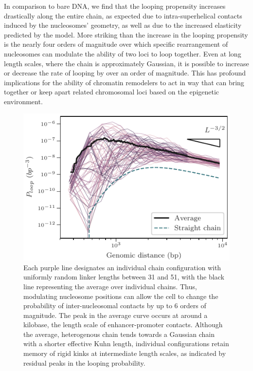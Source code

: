 \documentclass[%
 reprint,
superscriptaddress,
showpacs,preprintnumbers,
 amsmath,amssymb,
 aps,
 prl,
]{revtex4-1}
\begin{document}
In comparison to bare DNA, we find that the looping propensity increases
    drastically along the entire chain, as expected due to intra-superhelical
    contacts induced by the nucleosomes' geometry, as well as due to the
    increased elasticity predicted by the model.
More striking than the increase in the looping propensity is the nearly four
    orders of magnitude over which specific rearrangement of nucleosomes can
    modulate the ability of two loci to loop together.
Even at long length scales, where the chain is approximately Gaussian, it is
    possible to increase or decrease the rate of looping by over an order of
    magnitude.
This has profound implications for the ability of chromatin remodelers to act in
    way that can bring together or keep apart related chromosomal loci based on
    the epigenetic environment.

\begin{figure}[t]
    \centering
    \includegraphics{./figures/fig5_looping_hetero31to52bp.pdf}
    \caption{Each purple line designates an individual chain configuration
    with uniformly random linker lengths between 31 and \SI{51}{\basepair}, with
    the black line representing the average over individual chains. Thus, modulating nucleosome positions can allow the cell to change
    the probability of inter-nucleosomal contacts by up to 6 orders of
    magnitude. The peak in the average curve occurs at around a kilobase, the
    length scale of enhancer-promoter contacts. Although the average,
    heterogenous chain tends towards a Gaussian chain with a shorter
    effective Kuhn length, individual configurations retain memory of rigid kinks
    at intermediate length scales, as indicated by residual peaks in the looping
    probability.}\label{fig:looping}
\end{figure}
\end{document}
